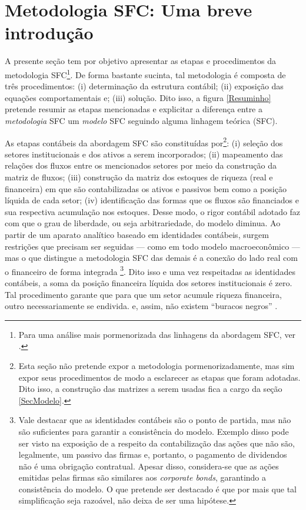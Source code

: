 \section{Metodologia SFC: Uma breve introdução}
\label{IntroSFC}


A presente seção tem por objetivo apresentar as etapas e procedimentos da metodologia  SFC\footnote{Para uma análise mais pormenorizada das linhagens da abordagem SFC, ver \textcite{caverzasi_stock-flow_2013}.}. De forma bastante sucinta, tal metodologia é composta de três procedimentos: (i) determinação da estrutura contábil; (ii) exposição das equações comportamentais e; (iii) solução. Dito isso, a figura \ref{Resuminho} pretende resumir as etapas mencionadas e explicitar a diferença entre a \textit{metodologia} SFC um \textit{modelo} SFC seguindo alguma linhagem teórica (SFC). 



As etapas contábeis da abordagem SFC são constituídas por\footnote{Esta seção não pretende expor a metodologia pormenorizadamente, mas sim expor seus procedimentos de modo a esclarecer as etapas que foram adotadas. Dito isso, a construção das matrizes a serem usadas fica a cargo da seção \ref{SecModelo}.}: (i) seleção dos setores institucionais e dos ativos a serem incorporados; (ii) mapeamento das relações dos fluxos entre os mencionados setores por meio da construção da matriz de fluxos; (iii) construção da matriz dos estoques de riqueza (real e financeira) em que são contabilizadas os ativos e passivos  bem como a posição líquida de cada setor; (iv) identificação das formas que os fluxos são financiados e sua respectiva acumulação nos estoques. Desse modo, o rigor contábil adotado faz com que o grau de liberdade, ou seja arbitrariedade, do modelo diminua. 
Ao partir de um aparato analítico baseado em identidades contábeis, surgem restrições que precisam ser seguidas  --- como em todo modelo macroeconômico --- mas o que distingue a metodologia SFC das demais é a conexão do lado real com o financeiro de forma integrada
\footnote{Vale destacar que as identidades contábeis são o ponto de partida, mas não são suficientes para garantir a consistência do modelo. Exemplo disso pode ser visto na exposição de  \textcite[p.~27--8]{godley_monetary_2007}  a respeito da contabilização das ações que não são, legalmente, um passivo das firmas e, portanto, o pagamento de dividendos não é uma obrigação contratual. Apesar disso, considera-se que as ações emitidas pelas firmas são similares aos \textit{corporate bonds}, garantindo a consistência do modelo. O que pretende ser destacado é que por mais que tal simplificação seja razoável, não deixa de ser uma hipótese.}. 
Dito isso e uma vez respeitadas as identidades contábeis, a soma da posição financeira líquida dos setores institucionais é zero. Tal procedimento garante que para que um setor acumule riqueza financeira, outro necessariamente se endivida. e, assim, não existem ``buracos negros'' \cite{godley_money_1996}. 


